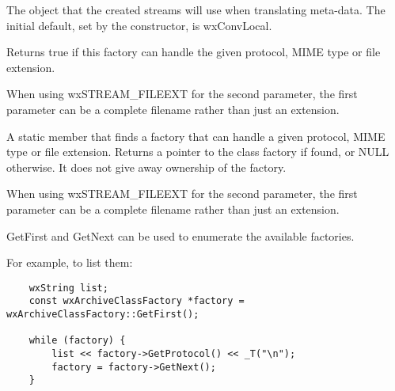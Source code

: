 

\label{wxarchiveclassfactoryconv}



The  object that the created streams
will use when translating meta-data. The initial default, set by the
constructor, is wxConvLocal.


\label{wxarchiveclassfactorycanhandle}


Returns true if this factory can handle the given protocol, MIME type
or file extension.

When using wxSTREAM\_FILEEXT for the second parameter, the first parameter
can be a complete filename rather than just an extension.


\label{wxarchiveclassfactoryfind}


A static member that finds a factory that can handle a given protocol, MIME
type or file extension.  Returns a pointer to the class factory if found, or
NULL otherwise. It does not give away ownership of the factory.

When using wxSTREAM\_FILEEXT for the second parameter, the first parameter
can be a complete filename rather than just an extension.


\label{wxarchiveclassfactorygetfirst}



GetFirst and GetNext can be used to enumerate the available factories.

For example, to list them:

\begin{verbatim}
    wxString list;
    const wxArchiveClassFactory *factory = wxArchiveClassFactory::GetFirst();

    while (factory) {
        list << factory->GetProtocol() << _T("\n");
        factory = factory->GetNext();
    }

\end{verbatim}

